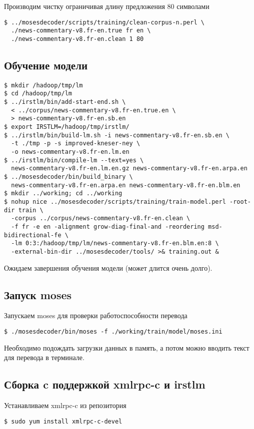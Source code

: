 Производим чистку ограничивая длину предложения 80 символами
\begin{lstlisting}
$ ../mosesdecoder/scripts/training/clean-corpus-n.perl \
  ./news-commentary-v8.fr-en.true fr en \
  ./news-commentary-v8.fr-en.clean 1 80
\end{lstlisting}

\subsection{Обучение модели}
\begin{lstlisting}
$ mkdir /hadoop/tmp/lm
$ cd /hadoop/tmp/lm
$ ../irstlm/bin/add-start-end.sh \
  < ../corpus/news-commentary-v8.fr-en.true.en \
  > news-commentary-v8.fr-en.sb.en
$ export IRSTLM=/hadoop/tmp/irstlm/
$ ../irstlm/bin/build-lm.sh -i news-commentary-v8.fr-en.sb.en \
  -t ./tmp -p -s improved-kneser-ney \
  -o news-commentary-v8.fr-en.lm.en
$ ../irstlm/bin/compile-lm --text=yes \
  news-commentary-v8.fr-en.lm.en.gz news-commentary-v8.fr-en.arpa.en
$ ../mosesdecoder/bin/build_binary \
  news-commentary-v8.fr-en.arpa.en news-commentary-v8.fr-en.blm.en
$ mkdir ../working; cd ../working
$ nohup nice ../mosesdecoder/scripts/training/train-model.perl -root-dir train \
  -corpus ../corpus/news-commentary-v8.fr-en.clean \
  -f fr -e en -alignment grow-diag-final-and -reordering msd-bidirectional-fe \
  -lm 0:3:/hadoop/tmp/lm/news-commentary-v8.fr-en.blm.en:8 \
  -external-bin-dir ../mosesdecoder/tools/ >& training.out &
\end{lstlisting}
Ожидаем завершения обучения модели (может длится очень долго).

\subsection{Запуск moses}
Запускаем moses для проверки работоспособности перевода
\begin{lstlisting}
$ ./mosesdecoder/bin/moses -f ./working/train/model/moses.ini
\end{lstlisting}
Необходимо подождать загрузки данных в память, а потом можно вводить текст для перевода в терминале.

\subsection{Сборка c поддержкой xmlrpc-c и irstlm}
Устанавливаем xmlrpc-c из репозитория
\begin{lstlisting}
$ sudo yum install xmlrpc-c-devel
\end{lstlisting}

